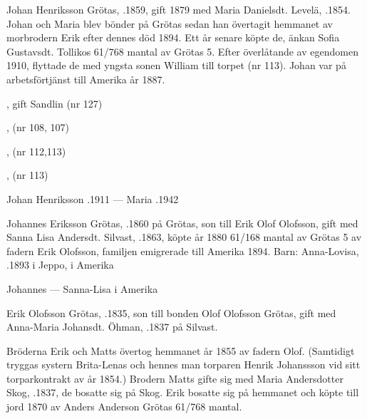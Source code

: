 %
Johan Henriksson Grötas, .1859, gift 1879 med Maria Danielsdt. Levelä, .1854. Johan och Maria blev bönder på Grötas sedan han övertagit hemmanet av morbrodern Erik efter dennes död 1894. Ett år senare köpte de, änkan Sofia Gustavsdt. Tollikos 61/768 mantal av Grötas 5.  Efter överlåtande av egendomen 1910, flyttade de med yngsta sonen William till torpet (nr 113). Johan var på arbetsförtjänst till Amerika år 1887.
\begin{jhchildren}
  \item {}, gift Sandlin (nr 127)
  \item {}, (nr 108, 107)
  \item {}, (nr 112,113)
  \item {}
  \item {}, (nr 113)
\end{jhchildren}

Johan Henriksson .1911  ---  Maria .1942


%
Johannes Eriksson Grötas, .1860 på Grötas, son till Erik Olof Olofsson, gift med Sanna Lisa Andersdt. Silvast, .1863, köpte år 1880 61/168 mantal av Grötas 5 av fadern Erik Olofsson,  familjen emigrerade till Amerika 1894.
Barn: Anna-Lovisa, .1893 i Jeppo,  i Amerika

Johannes   ---  Sanna-Lisa  i Amerika


%
Erik Olofsson Grötas, .1835, son till bonden Olof Olofsson Grötas, gift med Anna-Maria Johansdt. Öhman, .1837 på Silvast.

Bröderna Erik och Matts övertog hemmanet år 1855 av fadern Olof. (Samtidigt tryggas systern Brita-Lenas och hennes man torparen Henrik Johanssson vid sitt torparkontrakt av år 1854.) Brodern Matts gifte sig med Maria Andersdotter Skog, .1837, de bosatte sig på Skog. Erik bosatte sig på hemmanet och köpte till jord 1870 av Anders Anderson Grötas 61/768 mantal.


